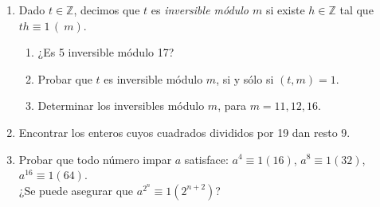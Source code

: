 \documentclass[a4paper,12pt,twoside,spanish,reqno]{amsbook}
\numberwithin{equation}{section}
\begin{document}
\begin{enumerate}



\item Dado $t \in {\mathbb Z}$, decimos que $t$ es {\it inversible m\'odulo $m$} si existe $h \in {\mathbb Z}$ tal que $th\equiv 1\,(\ m)$.
  \begin{enumerate}
  \item ¿Es 5 inversible m\'odulo 17?
  \item Probar que $t$ es inversible m\'odulo $m$, si y s\'olo si $(t,m)=1$.
  \item Determinar los inversibles m\'odulo $m$, para $m=11,12,16$.
  \end{enumerate}




\item Encontrar los enteros cuyos cuadrados divididos por 19 dan resto 9.


\item Probar que todo n\'umero impar $a$ satisface: $a^4 \equiv 1(16)$, $a^8 \equiv 1(32)$, $a^{16}\equiv 1(64)$.\\ ¿Se puede asegurar que $a^{2^n} \equiv 1 (2^{n+2})$?



\end{enumerate}
\end{document}
